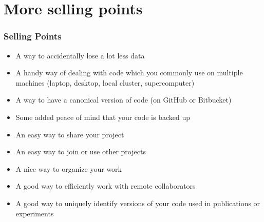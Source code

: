 \documentclass{beamer}
\begin{document}
\section{More selling points}
\begin{frame}[fragile]
\frametitle{Selling Points}
\begin{itemize}
\item A way to accidentally lose a lot less data
\item A handy way of dealing with code which you commonly use on multiple machines (laptop, desktop, local cluster, supercomputer)
\item A way to have a canonical version of code (on GitHub or Bitbucket)
\item Some added peace of mind that your code is backed up
\item An easy way to share your project
\item An easy way to join or use other projects
\item A nice way to organize your work
\item A good way to efficiently work with remote collaborators
\item A good way to uniquely identify versions of your code used in publications or experiments
\end{itemize}
\end{frame}
\end{document}
